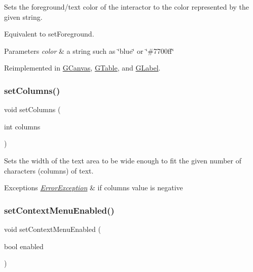 Sets the foreground/text color of the interactor to the color represented by the given string. 

Equivalent to set\+Foreground. 
\begin{DoxyParams}{Parameters}
{\em color} & a string such as \char`\"{}blue\char`\"{} or \char`\"{}\#7700ff\char`\"{} \\
\hline
\end{DoxyParams}


Reimplemented in \mbox{\hyperlink{classGCanvas_ad148324da1b0340e84e24dffa577ffca}{G\+Canvas}}, \mbox{\hyperlink{classGTable_ad148324da1b0340e84e24dffa577ffca}{G\+Table}}, and \mbox{\hyperlink{classGLabel_ad148324da1b0340e84e24dffa577ffca}{G\+Label}}.

\mbox{\label{classGTextArea_a3f29cc2956a84cdbce6327f1da4d86e9}} 
\subsubsection{\texorpdfstring{set\+Columns()}{setColumns()}}
{\footnotesize\ttfamily void set\+Columns (\begin{DoxyParamCaption}\item[{int}]{columns }\end{DoxyParamCaption})\hspace{0.3cm}{\ttfamily [virtual]}}



Sets the width of the text area to be wide enough to fit the given number of characters (columns) of text. 


\begin{DoxyExceptions}{Exceptions}
{\em \mbox{\hyperlink{classErrorException}{Error\+Exception}}} & if columns value is negative \\
\hline
\end{DoxyExceptions}
\mbox{\label{classGTextArea_a1a83404ffa5c72d747681b3505e73001}} 
\subsubsection{\texorpdfstring{set\+Context\+Menu\+Enabled()}{setContextMenuEnabled()}}
{\footnotesize\ttfamily void set\+Context\+Menu\+Enabled (\begin{DoxyParamCaption}\item[{bool}]{enabled }\end{DoxyParamCaption})\hspace{0.3cm}{\ttfamily [virtual]}}



